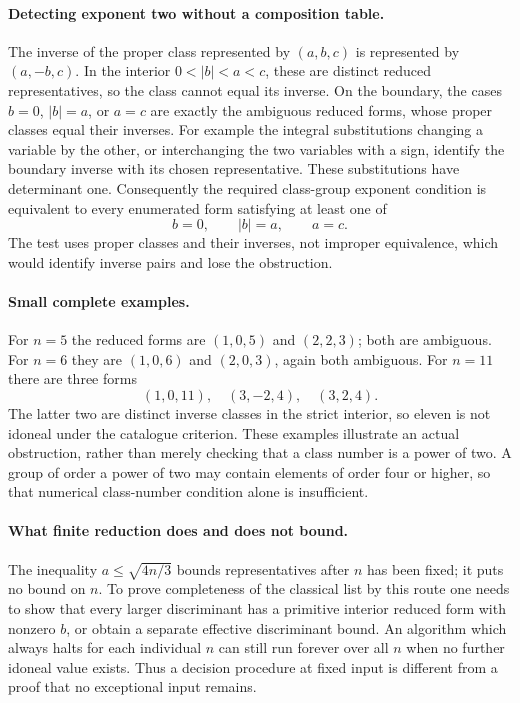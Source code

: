 \documentclass[11pt,a4paper]{article}
\begin{document}
\paragraph{Detecting exponent two without a composition table.}
The inverse of the proper class represented by $(a,b,c)$ is represented
by $(a,-b,c)$. In the interior $0<|b|<a<c$, these are distinct reduced
representatives, so the class cannot equal its inverse. On the boundary,
the cases $b=0$, $|b|=a$, or $a=c$ are exactly the ambiguous reduced
forms, whose proper classes equal their inverses. For example the
integral substitutions changing a variable by the other, or interchanging
the two variables with a sign, identify the boundary inverse with its
chosen representative. These substitutions have determinant one.
Consequently the required class-group exponent condition is equivalent
to every enumerated form satisfying at least one of
\[
                       b=0,\qquad |b|=a,\qquad a=c.
\]
The test uses proper classes and their inverses, not improper equivalence,
which would identify inverse pairs and lose the obstruction.

\paragraph{Small complete examples.}
For $n=5$ the reduced forms are $(1,0,5)$ and $(2,2,3)$; both are
ambiguous. For $n=6$ they are $(1,0,6)$ and $(2,0,3)$, again both
ambiguous. For $n=11$ there are three forms
\[
                   (1,0,11),\quad (3,-2,4),\quad(3,2,4).
\]
The latter two are distinct inverse classes in the strict interior,
so eleven is not idoneal under the catalogue criterion. These examples
illustrate an actual obstruction, rather than merely checking that a
class number is a power of two. A group of order a power of two may
contain elements of order four or higher, so that numerical class-number
condition alone is insufficient.

\paragraph{What finite reduction does and does not bound.}
The inequality $a\le\sqrt{4n/3}$ bounds representatives after $n$
has been fixed; it puts no bound on $n$. To prove completeness of the
classical list by this route one needs to show that every larger
discriminant has a primitive interior reduced form with nonzero $b$,
or obtain a separate effective discriminant bound. An algorithm which
always halts for each individual $n$ can still run forever over all
$n$ when no further idoneal value exists. Thus a decision procedure
at fixed input is different from a proof that no exceptional input
remains.
\end{document}
